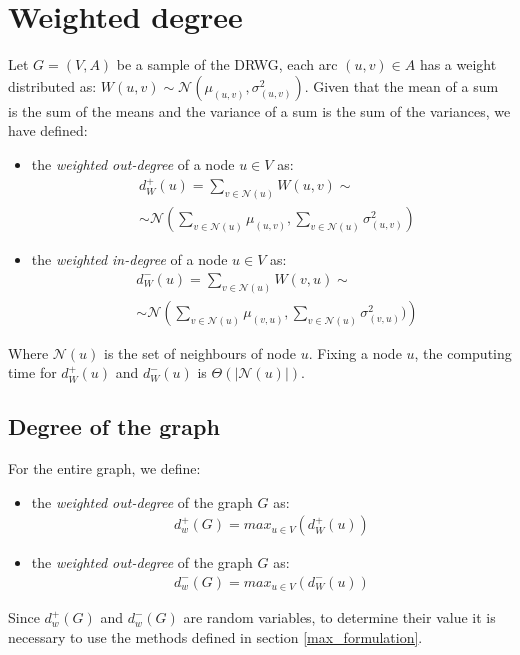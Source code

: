 \section{Weighted degree}
Let \( G = (V, A) \) be a sample of the DRWG, each arc \( (u, v) \in A \) has a weight distributed as: $W(u, v) \sim \mathcal{N}(\mu_{(u, v)}, \sigma^2_{(u, v)})$.
Given that the mean of a sum is the sum of the means and the variance of a sum is the sum of the variances, we have defined:
\begin{itemize}
	\item the \textit{weighted out-degree} of a node $u\in V$ as:
	\begin{align*}
		&d_W^+(u) = \sum_{v \in \mathcal{N}(u)} W(u, v) \sim \\
		&\sim \mathcal{N} \left( \sum_{v \in \mathcal{N}(u)} \mu_{(u, v)}, \sum_{v \in \mathcal{N}(u)} \sigma^2_{(u, v)}\right)
	\end{align*}
	\item the \textit{weighted in-degree} of a node $u\in V$ as:
	\begin{align*}
		&d_W^-(u) = \sum_{v \in \mathcal{N}(u)} W(v, u) \sim \\
		&\sim \mathcal{N}\left(\sum_{v \in \mathcal{N}(u)} \mu_{(v, u)}, \sum_{v \in \mathcal{N}(u)} \sigma^2_{(v, u)})\right)
	\end{align*}
\end{itemize}

Where $\mathcal{N}(u)$ is the set of neighbours of node $u$.
Fixing a node $u$, the computing time for $d_W^+(u)$ and $d_W^-(u)$ is $\Theta(|\mathcal{N}(u)|)$.

\subsection{Degree of the graph}
For the entire graph, we define:
\begin{itemize}
	\item the \textit{weighted out-degree} of the graph $G$ as:
	\begin{align*}
		d^+_w(G) = max_{u\in V}(d_W^+(u))
	\end{align*}
	\item the \textit{weighted out-degree} of the graph $G$ as:
	\begin{align*}
		d^-_w(G) = max_{u\in V}(d_W^-(u))
	\end{align*}
\end{itemize}
Since $d^+_w(G)$ and $d^-_w(G)$ are random variables, to determine their value it is necessary to use the methods defined in section \ref{max_formulation}.